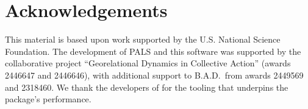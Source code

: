\section{Acknowledgements}

This material is based upon work supported by the U.S. National Science Foundation.
The development of PALS and this software was supported by the collaborative
project ``Georelational Dynamics in Collective Action'' (awards 2446647 and
2446646), with additional support to B.A.D.\ from awards 2449569 and 2318460. We
thank the developers of  for the tooling that underpins the
package's performance.



\address{Sangyeon Kim\\
Division of Communication and Media, Ewha Womans University\\
Seoul, Republic of Korea\\
\textit{ORCID: \href{https://orcid.org/0000-0001-9105-8598}{0000-0001-9105-8598}}}

\address{Howard Liu\\
Department of Political Science, University of South Carolina\\
Columbia, SC, USA\\
\textit{ORCID: \href{https://orcid.org/0000-0002-3479-9864}{0000-0002-3479-9864}}}

\address{Bruce A. Desmarais\\
Department of Political Science, Pennsylvania State University\\
University Park, PA, USA\\
\textit{ORCID: \href{https://orcid.org/0000-0002-3031-8883}{0000-0002-3031-8883}}\\
\href{mailto:bdesmarais@psu.edu}{bdesmarais@psu.edu}}
